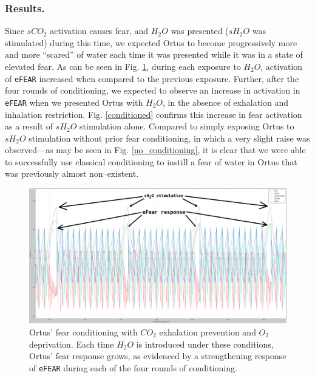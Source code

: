 \documentclass[letterpaper]{article}
\begin{document}
\subsubsection{Results.} Since $sCO_2$ activation causes fear, and $H_2O$ was presented ($sH_2O$ was stimulated) during this time, we expected Ortus to become progressively more and more ``scared'' of water each time it was presented while it was in a state of elevated fear.
As can be seen in Fig. \ref{conditioning}, during each exposure to $H_2O$, activation of \texttt{eFEAR} increased when compared to the previous exposure.
Further, after the four rounds of conditioning, we expected to observe an increase in activation in \texttt{eFEAR} when we presented Ortus with $H_2O$, in the absence of exhalation and inhalation restriction. Fig. \ref{conditioned} confirms this increase in fear activation as a result of $sH_2O$ stimulation alone. Compared to simply exposing Ortus to $sH_2O$ stimulation without prior fear conditioning, in which a very slight raise was observed---as may be seen in Fig. \ref{no_conditioning}, it is clear that we were able to successfully use classical conditioning to instill a fear of water in Ortus that was previously almost non--existent. 


\setlength{\belowcaptionskip}{-.25in}

\begin{figure}
\begin{center}
\includegraphics[width=\textwidth]{images/conditioning_small_annotated.png}
\caption{Ortus' fear conditioning with $CO_2$ exhalation prevention and $O_2$ deprivation. Each time $H_2O$ is introduced under these conditions, Ortus' fear response grows, as evidenced by a strengthening response of \texttt{eFEAR} during each of the four rounds of conditioning.}
\label{conditioning}
\end{center}
\end{figure}
\end{document}
